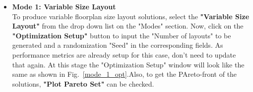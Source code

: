 \documentclass[11pt]{article}
\begin{document}
\begin{itemize}
    Using \textbf{"Save Selected Solutions"} button, the solution can be saved to main window (shown in Fig.~\ref{save_sol} (a)) and using \textbf{"Save All Solutions"} button, the data can be saved to a csv file (shown in Fig.~\ref{save_sol} (b)).
    \begin{figure}[t]
    \centering
    \qquad
    \caption{Saving solution options}
    \label{save_sol}
    \end{figure}
    \item \textbf{Mode 1: Variable Size Layout}\\
    To produce variable floorplan size layout solutions, select the \textbf{"Variable Size Layout"} from the drop down list on the "Modes" section. Now, click on the \textbf{"Optimization Setup"} button to input the "Number of layouts" to be generated and a randomization "Seed" in the corresponding fields. As performance metrics are already setup for this case, don't need to update that again. At this stage the "Optimization Setup" window will look like the same as shown in Fig.~\ref{mode_1_opt}.Also, to get the PAreto-front of the solutions, \textbf{"Plot Pareto Set"} can be checked.
    

\end{itemize}
\end{document}
